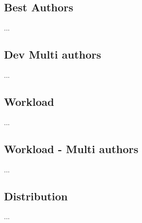 \documentclass[12pt]{article}
\begin{document}
\subsection{Best Authors}

...

\subsection{Dev Multi authors}

...

\subsection{Workload}

...

\subsection{Workload - Multi authors}

...

\subsection{Distribution}

...


\footnotesize


\end{document}
